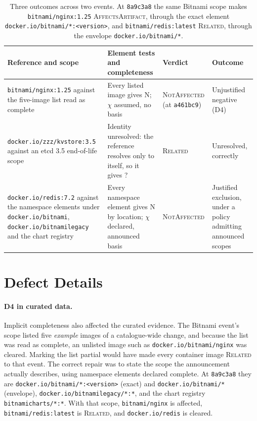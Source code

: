 \documentclass[11pt,a4paper]{article}
\newcommand{\code}[1]{\texttt{#1}}
\newcommand{\Non}{\textsf{N}}
\newcommand{\Ind}{\textsf{?}}
\newcommand{\commit}{\code{a461bc9}}
\newcommand{\pincommit}{\code{8a9c3a8}}
\begin{document}
\begin{table}[h]
\centering
\footnotesize
\begin{tabularx}{\linewidth}{@{}>{\raggedright\arraybackslash}p{3.2cm} >{\raggedright\arraybackslash}X >{\raggedright\arraybackslash}p{2.5cm} >{\raggedright\arraybackslash}p{2.4cm}@{}}
\toprule
Reference and scope & Element tests and completeness & Verdict & Outcome \\
\midrule
\code{bitnami/\allowbreak nginx:1.25} against the five-image list read as
  complete & Every listed image gives \Non{}; $\chi$ assumed, no basis &
  \textsc{Not\-Affected} (at \commit{}) & Unjustified negative (D4) \\
\code{docker.io/\allowbreak zzz/\allowbreak kvstore:3.5} against an etcd 3.5 end-of-life scope &
  Identity unresolved: the reference resolves only to itself, so it gives
  \Ind{} & \textsc{Related} & Unresolved, correctly \\
\code{docker.io/\allowbreak redis:7.2} against the namespace elements
  under \code{docker.io/\allowbreak bitnami}, \code{docker.io/\allowbreak bitnamilegacy}
  and the chart registry & Every namespace element gives \Non{} by location; $\chi$ declared, announced
  basis & \textsc{Not\-Affected} & Justified exclusion, under a policy
  admitting announced scopes \\
\bottomrule
\end{tabularx}
\caption{Three outcomes across two events. At \pincommit{} the same
Bitnami scope makes \code{bitnami/nginx:1.25} \textsc{AffectsArtifact},
through the exact element \code{docker.io/bitnami/*:<version>}, and
\code{bitnami/redis:latest} \textsc{Related}, through the envelope
\code{docker.io/bitnami/*}.}
\label{tab:trace}
\end{table}

\section{Defect Details}
\label{app:defects}
\paragraph{D4 in curated data.} Implicit completeness also affected the
curated evidence. The Bitnami event's scope listed five
\emph{example} images of a catalogue-wide change, and because the list
was read as complete, an unlisted image such as
\code{docker.io/bitnami/nginx} was cleared. Marking the list partial
would have made every container image \textsc{Related} to that event.
The correct repair was to state the scope the announcement actually
describes, using namespace elements declared complete. At
\pincommit{} they are \code{docker.io/bitnami/*:<version>} (exact) and
\code{docker.io/bitnami/*} (envelope), \code{docker.io/bitnamilegacy/*:*},
and the chart registry \code{bitnamicharts/*:*}. With that scope,
\code{bitnami/nginx} is affected, \code{bitnami/redis:latest} is
\textsc{Related}, and \code{docker.io/redis} is cleared.
\end{document}

